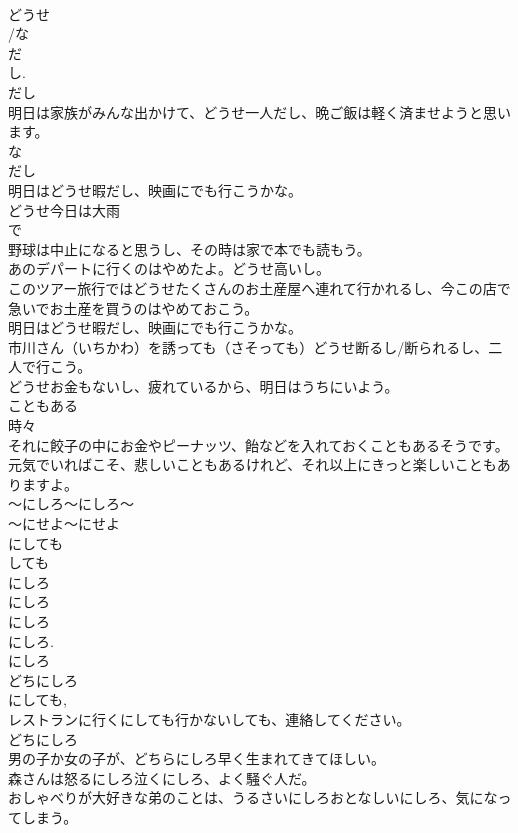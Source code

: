 \documentclass[8pt]{extreport}
\begin{document}
\begin{CJK}{UTF8}{min}
\\	どうせ
\\	/な
\\	だ
\\	し.
\\	だし 
\\	明日は家族がみんな出かけて、どうせ一人だし、晩ご飯は軽く済ませようと思います。
\\	な
\\	だし 
\\	明日はどうせ暇だし、映画にでも行こうかな。
\\	どうせ今日は大雨
\\	で
\\	野球は中止になると思うし、その時は家で本でも読もう。
\\	あのデパートに行くのはやめたよ。どうせ高いし。
\\	このツアー旅行ではどうせたくさんのお土産屋へ連れて行かれるし、今この店で急いでお土産を買うのはやめておこう。
\\	明日はどうせ暇だし、映画にでも行こうかな。
\\	市川さん（いちかわ）を誘っても（さそっても）どうせ断るし/断られるし、二人で行こう。
\\	どうせお金もないし、疲れているから、明日はうちにいよう。
\\	こともある
\\	時々 
\\	それに餃子の中にお金やピーナッツ、飴などを入れておくこともあるそうです。
\\	元気でいればこそ、悲しいこともあるけれど、それ以上にきっと楽しいこともありますよ。
\\	～にしろ～にしろ～
\\	～にせよ～にせよ
\\	にしても 
\\	しても
\\	にしろ
\\	にしろ 
\\	にしろ
\\	にしろ. 
\\	にしろ 
\\	どちにしろ 
\\	にしても, 
\\	レストランに行くにしても行かないしても、連絡してください。
\\	どちにしろ 
\\	男の子か女の子が、どちらにしろ早く生まれてきてほしい。
\\	森さんは怒るにしろ泣くにしろ、よく騒ぐ人だ。
\\	おしゃべりが大好きな弟のことは、うるさいにしろおとなしいにしろ、気になってしまう。

\end{CJK}
\end{document}
